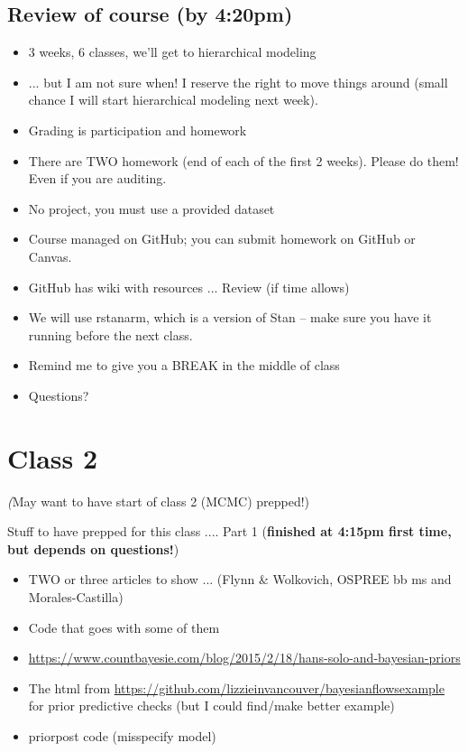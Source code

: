 \documentclass[11pt]{article}
\begin{document}
\subsection{Review of course (by 4:20pm)}
\begin{itemize}
\item 3 weeks, 6 classes, we'll get to hierarchical modeling
\item ... but I am not sure when! I reserve the right to move things around (small chance I will start hierarchical modeling next week). 
\item Grading is participation and homework
\item There are TWO homework (end of each of the first 2 weeks). Please do them! Even if you are auditing.
\item No project, you must use a provided dataset
\item Course managed on GitHub; you can submit homework on GitHub or Canvas. 
\item GitHub has wiki with resources ... Review (if time allows)
\item We will use rstanarm, which is a version of Stan -- make sure you have it running before the next class. 
\item Remind me to give you a BREAK in the middle of class
\item Questions?
\end{itemize}

\newpage
\section{Class 2} 
\emph(May want to have start of class 2 (MCMC) prepped!)

Stuff to have prepped for this class .... Part 1 ({\bf finished at 4:15pm first time, but depends on questions!})
\begin{itemize}
\item TWO or three articles to show ... (Flynn \& Wolkovich, OSPREE bb ms and Morales-Castilla)
\item Code that goes with some of them %
\item \url{https://www.countbayesie.com/blog/2015/2/18/hans-solo-and-bayesian-priors} %
\item The html from \url{https://github.com/lizzieinvancouver/bayesianflowsexample} for prior predictive checks (but I could find/make better example)
\item priorpost code (misspecify model)
\end{itemize}
\end{document}
